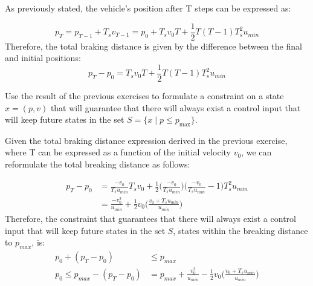\documentclass[]{article}
\begin{document}
\begin{flushleft}
As previously stated, the vehicle's position after T steps can be expressed as:
\end{flushleft}
\begin{equation}
		p_T = p_{T-1} + T_s v_{T-1} = p_0 + T_s v_0 T + \frac{1}{2} T (T-1) T_s^2 u_{min}
\end{equation}
Therefore, the total braking distance is given by the difference between the final and initial positions:
\begin{equation}
		p_T - p_0 = T_s v_0 T + \frac{1}{2} T (T-1) T_s^2 u_{min}
\end{equation}




\begin{assignment}\label{ex:sess2-constraint}
   Use the result of the previous exercises to formulate a constraint on a state $x = (p, v)$ that 
   will guarantee that there will always exist a control input that will keep future states 
   in the set $S = \{x \mid p \leq p_{\max}\}$.
\end{assignment}

\begin{flushleft}
	Given the total braking distance expression derived in the previous exercise, where T can be expressed as a function of the initial velocity $v_0$, we can reformulate the total breaking distance as follows:
\end{flushleft}
\begin{equation}
	\begin{aligned}
		p_T - p_0 &= \frac{-v_0}{T_s u_{min}} T_s v_0 + \frac{1}{2} \Bigg(\frac{-v_0}{T_s u_{min}}\Bigg) \Bigg(\frac{-v_0}{T_s u_{min}}-1\Bigg) T_s^2 u_{min} \\
				  &= \frac{-v_0^2}{u_{min}} + \frac{1}{2} v_0 \Bigg( \frac{v_0 + T_s u_{min}}{u_{min}}\Bigg) 
	\end{aligned}
\end{equation}
Therefore, the constraint that guarantees that there will always exist a control input that will keep future states in the set $S$, states within the breaking distance to $p_{max}$, is:
\begin{equation}
	\begin{aligned}
		p_0 + (p_T - p_0) &\leq p_{max} \\
		p_0 \leq p_{max} - (p_T - p_0) &= p_{max} + \frac{v_0^2}{u_{min}} - \frac{1}{2} v_0 \Bigg( \frac{v_0 + T_s u_{min}}{u_{min}}\Bigg)
	\end{aligned}
\end{equation}
\end{document}
